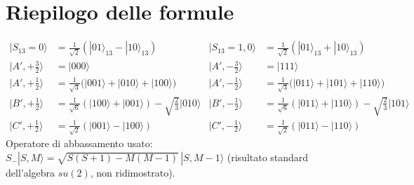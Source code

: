 \documentclass[11pt,a4paper]{article}
\begin{document}
\appendix
\section{Riepilogo delle formule}

\begin{align*}
|S_{13}{=}0\rangle &= \tfrac1{\sqrt2}(|01\rangle_{13}-|10\rangle_{13}) &
|S_{13}{=}1,0\rangle &= \tfrac1{\sqrt2}(|01\rangle_{13}+|10\rangle_{13})\\[4pt]
|A',{+}\tfrac32\rangle &= |000\rangle &
|A',{-}\tfrac32\rangle &= |111\rangle\\
|A',{+}\tfrac12\rangle &= \tfrac1{\sqrt3}\big(|001\rangle+|010\rangle+|100\rangle\big) &
|A',{-}\tfrac12\rangle &= \tfrac1{\sqrt3}\big(|011\rangle+|101\rangle+|110\rangle\big)\\
|B',{+}\tfrac12\rangle &= \tfrac1{\sqrt6}(|100\rangle+|001\rangle) - \sqrt{\tfrac23}|010\rangle &
|B',{-}\tfrac12\rangle &= \tfrac1{\sqrt6}(|011\rangle+|110\rangle) - \sqrt{\tfrac23}|101\rangle\\
|C',{+}\tfrac12\rangle &= \tfrac1{\sqrt2}(|001\rangle-|100\rangle) &
|C',{-}\tfrac12\rangle &= \tfrac1{\sqrt2}(|011\rangle-|110\rangle)
\end{align*}
Operatore di abbassamento usato: $S_-|S,M\rangle=\sqrt{S(S{+}1)-M(M{-}1)}\,|S,M{-}1\rangle$
(risultato standard dell'algebra $su(2)$, non ridimostrato).
\end{document}
